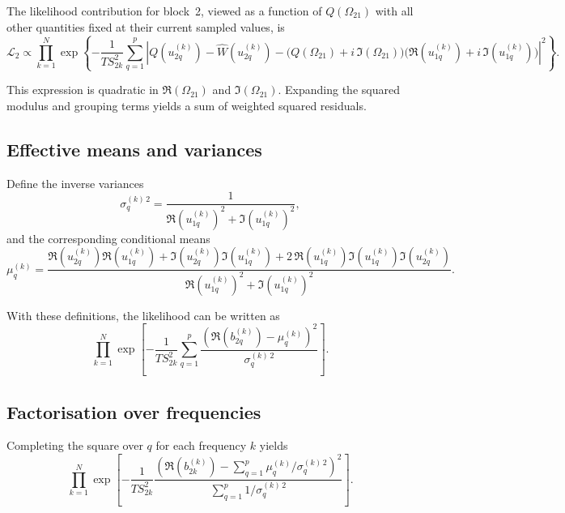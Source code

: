 The likelihood contribution for block~2, viewed as a function of
$Q(\Omega_{21})$ with all other quantities fixed at their current sampled
values, is
\begin{equation}
\mathcal{L}_2
\propto
\prod_{k=1}^{N}
\exp\!\left\{
-\frac{1}{T S_{2k}^2}
\sum_{q=1}^{p}
\left|
Q(u_{2q}^{(k)}) - \hat{W}(u_{2q}^{(k)})
-
\bigl(
Q(\Omega_{21}) + i\,\Im(\Omega_{21})
\bigr)
\bigl(
\Re(u_{1q}^{(k)}) + i\,\Im(u_{1q}^{(k)})
\bigr)
\right|^2
\right\}.
\end{equation}

This expression is quadratic in $\Re(\Omega_{21})$ and $\Im(\Omega_{21})$.
Expanding the squared modulus and grouping terms yields a sum of weighted
squared residuals.

\subsection{Effective means and variances}

Define the inverse variances
\begin{equation}
\sigma_q^{(k)\,2}
=
\frac{1}{
\Re(u_{1q}^{(k)})^2
+
\Im(u_{1q}^{(k)})^2
},
\end{equation}
and the corresponding conditional means
\begin{equation}
\mu_q^{(k)}
=
\frac{
\Re(u_{2q}^{(k)}) \Re(u_{1q}^{(k)})
+
\Im(u_{2q}^{(k)}) \Im(u_{1q}^{(k)})
+
2\,\Re(u_{1q}^{(k)}) \Im(u_{1q}^{(k)}) \Im(u_{2q}^{(k)})
}{
\Re(u_{1q}^{(k)})^2
+
\Im(u_{1q}^{(k)})^2
}.
\end{equation}

With these definitions, the likelihood can be written as
\begin{equation}
\prod_{k=1}^{N}
\exp\!\left[
-\frac{1}{T S_{2k}^2}
\sum_{q=1}^{p}
\frac{
\left(
\Re(b_{2q}^{(k)}) - \mu_q^{(k)}
\right)^2
}{
\sigma_q^{(k)\,2}
}
\right].
\end{equation}

\subsection{Factorisation over frequencies}

Completing the square over $q$ for each frequency $k$ yields
\begin{equation}
\prod_{k=1}^{N}
\exp\!\left[
-\frac{1}{T S_{2k}^2}
\frac{
\left(
\Re(b_{2k}^{(k)})
-
\sum_{q=1}^{p}
\mu_q^{(k)} / \sigma_q^{(k)\,2}
\right)^2
}{
\sum_{q=1}^{p}
1 / \sigma_q^{(k)\,2}
}
\right].
\end{equation}

